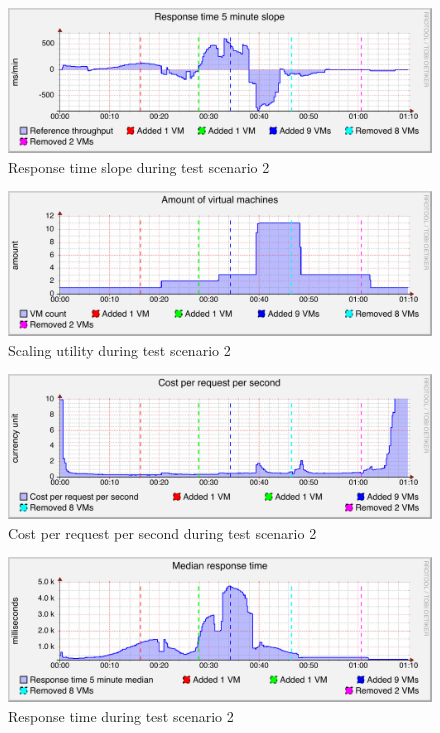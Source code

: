 \documentclass[english]{tktltiki2}
\theoremstyle{definition}
\theoremstyle{remark}
\begin{document}
\begin{figure}[htbp]
	\includegraphics[width=\textwidth]{images/responsetimeslopegraph-test23}
	\caption{Response time slope during test scenario 2}
	\label{fig:responseTimeSlopeScenario2}
\end{figure}

\begin{figure}[htbp]
	\includegraphics[width=\textwidth]{images/vmcountgraph-test23}
	\caption{Scaling utility during test scenario 2}
	\label{fig:vmCountScenario2}
\end{figure}

\begin{figure}[htbp]
	\includegraphics[width=\textwidth]{images/costperrequestpersecondgraph-test23}
	\caption{Cost per request per second during test scenario 2}
	\label{fig:costScenario2}
\end{figure}

\begin{figure}[htbp]
	\includegraphics[width=\textwidth]{images/responsetimegraph-test23}
	\caption{Response time during test scenario 2}
	\label{fig:responseTimeScenario2}
\end{figure}
\end{document}
